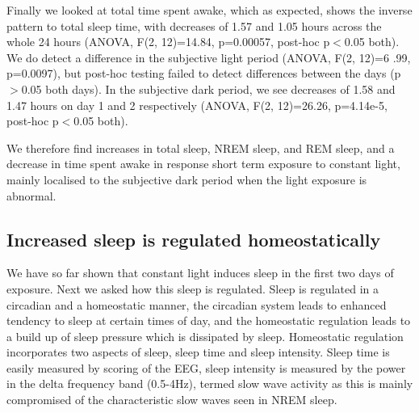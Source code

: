 Finally we looked at total time spent awake, which as expected, shows the
inverse pattern to total sleep time, with decreases of 1.57 and 1.05 hours
across the whole 24 hours (ANOVA, F(2, 12)=14.84, p=0.00057, post-hoc p$<$0.05
both).
We do detect a difference in the subjective light period (ANOVA, F(2, 12)=6
.99, p=0.0097), but post-hoc testing failed to detect differences between the
days (p$>$0.05 both days).
In the subjective dark period, we see decreases of 1.58 and 1.47 hours on day
1 and 2 respectively (ANOVA, F(2, 12)=26.26, p=4.14e-5, post-hoc p$<$0.05 both).

We therefore find increases in total sleep, NREM sleep, and REM sleep, and a
decrease in time spent awake in response short term exposure to constant
light, mainly localised to the subjective dark period when the light
exposure is abnormal.

\subsection{Increased sleep is regulated homeostatically}
We have so far shown that constant light induces sleep in the first two days
of exposure.
Next we asked how this sleep is regulated.
Sleep is regulated in a circadian and a homeostatic manner, the circadian
system leads to enhanced tendency to sleep at certain times of day, and the
homeostatic regulation leads to a build up of sleep pressure which is
dissipated by sleep.
Homeostatic regulation incorporates two aspects of sleep, sleep time and
sleep intensity.
Sleep time is easily measured by scoring of the EEG, sleep intensity is
measured by the power in the delta frequency band (0.5-4Hz), termed slow wave
activity as this is mainly compromised of the characteristic slow waves seen in
NREM sleep.



